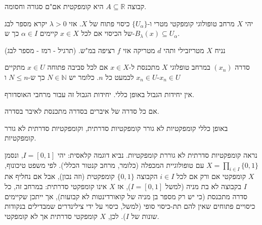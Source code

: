 \documentclass{tstextbook}
\begin{document}
\begin{proposition}
קבוצה \(A\subseteq \mathbb{R}\) היא קומפקטית אם"ם סגורה וחסומה.

\end{proposition}
\begin{definition}
יהי \(X\) מרחב טופולוגי קומפקטי מטרי ו-\(\{ U_{\alpha} \}\) כיסוי פתוח של \(X\). אזי \(\lambda> 0\) יקרא מספר לבג של הכיסוי אם לכל \(x \in X\) קיימים \(\alpha \in I\) כך ש-\(B_{\lambda}(x)\subseteq U_{\alpha}\).

\end{definition}
\begin{proposition}
נניח \(X\) מטריזבילי ותהי \(d\) מטריקה אזי \(f\) רציפה במ"ש. (תרגיל - רמז - מספר לבג)

\end{proposition}
\begin{definition}
סדרה \((x_{n})\) במרחב טופלוגי \(X\) מתכנסת ל-\(x \in X\) אם לכל סביבה פתוחה \(x \in U\) מתקיים \(x_{n}\in U\) לכמעט כל \(n\). כלומר יש \(N \in \mathbb{N}\) כך ש-\(N\leq n\) ו-\(x_{n}\in U\)

\end{definition}
\begin{remark}
אין יחידות הגבול באופן כללי. יחידות הגבול זה עבור מרחבי האוסדורף.

\end{remark}
\begin{definition}
אם כל סדרה של איברים בסדרה מתכנסת לאיבר בסדרה.

\end{definition}
\begin{remark}
באופן כללי קומפקטיות לא גורר קומפקטיות סדרתית, וקומפקטיות סדרתית לא גורר קומפקטיות.

\end{remark}
\begin{example}
נראה קומפקטיות סדרתית לא גוררת קומפקטיות. נביא דוגמה קלאסית: 
יהי \(I = [0,1]\), ונסמן \(X = \prod_{i \in I} \{0,1\}\) עם טופולוגיית המכפלה (כלומר, מרחב קנטור הכללי). 
לפי משפט טיכונוף, \(X\) קומפקטי אם ורק אם לכל \(i \in I\) הקבוצה \(\{0,1\}\) קומפקטית (וזה נכון), אבל אם נחליף את \(I\) בקבוצה לא בת מניה (למשל \(I = [0,1]\)), אז \(X\) אינו קומפקטי סדרתית: 
במרחב זה, כל סדרה מתכנסת (כי יש רק מספר בן מניה של קואורדינטות לא קבועות), אך ייתכן שקיימים כיסויים פתוחים שאין להם תת-כיסוי סופי (למשל, כיסוי על ידי צילינדרים שמבדילים בנקודות שונות של \(I\)).
לכן, \(X\) קומפקטי סדרתית אך לא קומפקטי.

\end{example}
\end{document}
